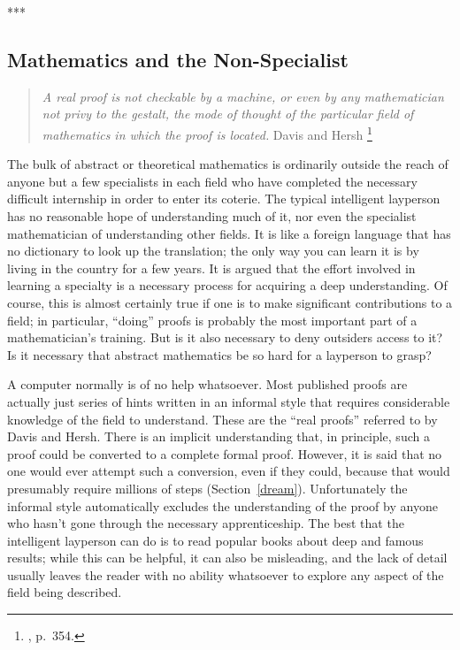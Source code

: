 \begin{center}
***
\end{center}

\subsection{Mathematics and the Non-Specialist}

\begin{quote}
  {\em A real proof is not checkable by a machine, or even by any mathematician
not privy to the gestalt, the mode of thought of the particular field of
mathematics in which the proof is located.}
  \flushright\sc  Davis and Hersh
  \footnote{\cite{Davis}, p.~354.}\\
\end{quote}

The bulk of abstract or theoretical mathematics is ordinarily outside
the reach of anyone but a few specialists in each field who have completed
the necessary difficult internship in order to enter its coterie.  The
typical intelligent layperson has no reasonable hope of understanding much of
it, nor even the specialist mathematician of understanding other fields.  It
is like a foreign language that has no dictionary to look up the translation;
the only way you can learn it is by living in the country for a few years.  It
is argued that the effort involved in learning a specialty is a necessary
process for acquiring a deep understanding.  Of course, this is almost certainly
true if one is to make significant contributions to a field; in particular,
``doing'' proofs is probably the most important part of a mathematician's
training.  But is it also necessary to deny outsiders access to it?  Is it
necessary that abstract mathematics be so hard for a layperson to grasp?

A computer normally is of no help whatsoever.  Most published proofs are
actually just series of hints written in an informal style that requires
considerable knowledge of the field to understand.  These are the ``real
proofs'' referred to by Davis and Hersh.  There is an
implicit understanding that, in principle, such a proof could be converted to
a complete formal proof.  However, it is said that no one
would ever attempt such a conversion, even if they could, because that would
presumably require millions of steps (Section~\ref{dream}).  Unfortunately the
informal style automatically excludes the understanding of the proof
by anyone who hasn't gone through the necessary apprenticeship. The
best that the intelligent layperson can do is to read popular books about deep
and famous results; while this can be helpful, it can also be misleading, and
the lack of detail usually leaves the reader with no ability whatsoever to
explore any aspect of the field being described.

